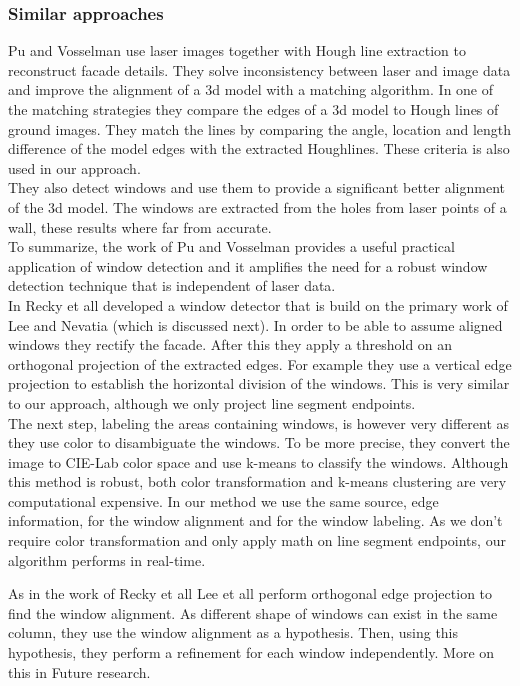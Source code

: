 \subsubsection{Similar approaches}
Pu and Vosselman \cite{Pu_refiningbuilding}
use laser images together with Hough line extraction to reconstruct facade details.  They solve inconsistency between laser and image data and improve the alignment of a 3d model with a matching algorithm.  In one of the matching strategies they compare the edges of a 3d model to Hough lines of ground images.
They match the lines by comparing the angle, location and length difference of the model edges with the extracted Houghlines.  These criteria is also used in our approach.\\
They also detect windows and use them to provide a significant better alignment of the 3d model.
The windows are extracted from the holes from laser points of a wall, these results where far from accurate.\\
To summarize, the work of Pu and Vosselman provides a useful practical application of window detection and it amplifies the need for a robust window detection technique that is independent of laser data.\\


In \cite{Recky_kmeans} Recky et all developed a window detector that is build on
the primary work of Lee and Nevatia \cite{Lee_extraction} (which is discussed
next).
In order to be able to assume aligned windows they rectify the facade.  After this they apply a threshold on an orthogonal projection of the extracted edges. 
For example they use a vertical edge projection to establish the horizontal division of the windows.
This is very similar to our approach, although we only project line segment endpoints.\\
The next step, labeling the areas containing windows, is however very different as they use color to disambiguate the windows.
To be more precise, they convert the image to CIE-Lab color space and use k-means to classify the windows.
Although this method is robust, both color transformation and k-means clustering are very computational expensive.
In our method we use the same source, edge information, for the window alignment and for the window labeling.
As we don't require color transformation and only apply math on line segment
endpoints, our algorithm performs in real-time.

As in the work of Recky et all \cite{Recky_kmeans} Lee et all
\cite{Lee_extraction}
perform orthogonal edge projection to find the window alignment.  As different
shape of windows can exist in the same column, they use the window alignment as
a hypothesis.  Then, using this hypothesis, they perform a refinement for each
window independently. More on this in Future research.

